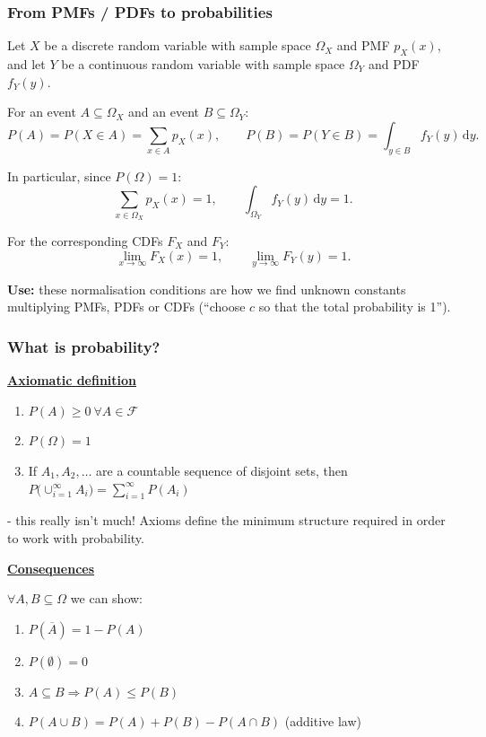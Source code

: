 \documentclass[t,8pt]{beamer}
\begin{document}
\begin{frame}
	\frametitle{From PMFs / PDFs to probabilities}
	
	Let $X$ be a discrete random variable with sample space $\Omega_X$ and PMF $p_X(x)$,
	and let $Y$ be a continuous random variable with sample space $\Omega_Y$ and PDF $f_Y(y)$.
	
	\medskip
	For an event $A\subseteq\Omega_X$ and an event $B\subseteq\Omega_Y$:
	\[
	P(A)=P(X\in A)=\sum_{x\in A} p_X(x), \qquad
	P(B)=P(Y\in B)=\int_{y\in B} f_Y(y)\,\mathrm{d}y.
	\]
	
	\medskip
	In particular, since $P(\Omega)=1$:
	\[
	\sum_{x\in\Omega_X} p_X(x)=1, \qquad
	\int_{\Omega_Y} f_Y(y)\,\mathrm{d}y = 1.
	\]
	
	For the corresponding CDFs $F_X$ and $F_Y$:
	\[
	\lim_{x\to\infty} F_X(x)=1, \qquad
	\lim_{y\to\infty} F_Y(y)=1.
	\]
	
	{\bf Use:} these normalisation conditions are how we find unknown constants
	multiplying PMFs, PDFs or CDFs (``choose $c$ so that the total probability is 1'').
\end{frame}

\begin{frame}
	\frametitle{What is probability?}
	{\bf\underline{Axiomatic definition}} \par
	\vspace{5pt}
	\begin{enumerate}
		\item $P(A)\geq 0\ \forall A\in\mathcal F$
		\item $P(\Omega)=1$
		\item If $A_1,A_2,\dots$ are a countable sequence of disjoint sets, then 
		$P\big(\cup_{i=1}^{\infty}A_i\big)=\sum_{i=1}^{\infty}P(A_i)$
	\end{enumerate}
	{\small\color{NavyBlue} - this really isn't much! Axioms define the minimum structure required in order to work with probability.} \par
	{\bf\underline{Consequences}} \par
	\vspace{5pt}
	$\forall A,B\subseteq\Omega$ we can show:
	\begin{enumerate}
		\item $P(\overline A)=1-P(A)$
		\item $P(\emptyset)=0$
		\item $A\subseteq B\Rightarrow P(A)\leq P(B)$
		\item $P(A\cup B)=P(A)+P(B)-P(A\cap B)$ (additive law)
	\end{enumerate}
\end{frame}
\end{document}
